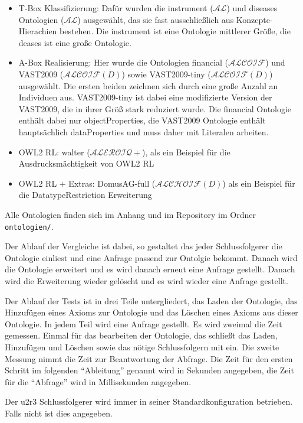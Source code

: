 \begin{itemize}
  \item T-Box Klassifizierung: Dafür wurden die instrument ($\mathcal{AL}$) und diseases Ontologien ($\mathcal{AL}$) ausgewählt, das sie fast ausschließlich aus Konzepte-Hierachien bestehen. Die instrument ist eine Ontologie mittlerer Größe, die deases ist eine große Ontologie.
  \item A-Box Realisierung: Hier wurde die Ontologien financial ($\mathcal{ALCOIF}$) und VAST2009 ($\mathcal{ALCOIF}(D)$) sowie VAST2009-tiny ($\mathcal{ALCOIF}(D)$) ausgewählt. Die ersten beiden zeichnen sich durch eine große Anzahl an Individuen aus. VAST2009-tiny ist dabei eine modifizierte Version der VAST2009, die in ihrer Größ stark reduziert wurde. Die financial Ontologie enthält dabei nur objectProperties, die VAST2009 Ontologie enthält hauptsächlich dataProperties und muss daher mit Literalen arbeiten.
  \item OWL2 RL: walter ($\mathcal{ALEROIQ}+$), als ein Beispiel für die Ausdrucksmächtigkeit von OWL2 RL
  \item OWL2 RL + Extras: DomusAG-full ($\mathcal{ALCHOIF}(D)$) als ein Beispiel für die DatatypeRestriction Erweiterung
\end{itemize}

Alle Ontologien finden sich im Anhang und im Repository im Ordner \texttt{ontologien/}.

Der Ablauf der Vergleiche ist dabei, so gestaltet das jeder Schlussfolgerer die Ontologie einliest und eine Anfrage passend zur Ontolgie bekommt. Danach wird die Ontologie erweitert und es wird danach erneut eine Anfrage gestellt. Danach wird die Erweiterung wieder gelöscht und es wird wieder eine Anfrage gestellt.

Der Ablauf der Tests ist in drei Teile untergliedert, das Laden der Ontologie, das Hinzufügen eines Axioms zur Ontologie und das Löschen eines Axioms aus dieser Ontologie. In jedem Teil wird eine Anfrage gestellt. Es wird zweimal die Zeit gemessen. Einmal für das bearbeiten der Ontologie, das schließt das Laden, Hinzufügen und Löschen sowie das nötige Schlussfolgern mit ein. Die zweite Messung nimmt die Zeit zur Beantwortung der Abfrage. Die Zeit für den ersten Schritt im folgenden ``Ableitung'' genannt wird in Sekunden angegeben, die Zeit für die ``Abfrage'' wird in Millisekunden angegeben.

Der u2r3 Schlussfolgerer wird immer in seiner Standardkonfiguration betrieben. Falls nicht ist dies angegeben.

